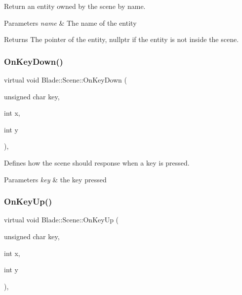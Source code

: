 Return an entity owned by the scene by name. 


\begin{DoxyParams}{Parameters}
{\em name} & The name of the entity \\
\hline
\end{DoxyParams}
\begin{DoxyReturn}{Returns}
The pointer of the entity, nullptr if the entity is not inside the scene. 
\end{DoxyReturn}
\mbox{\label{class_blade_1_1_scene_abb80a0590b4d723b5f13ec8c488e513a}} 
\subsubsection{\texorpdfstring{On\+Key\+Down()}{OnKeyDown()}}
{\footnotesize\ttfamily virtual void Blade\+::\+Scene\+::\+On\+Key\+Down (\begin{DoxyParamCaption}\item[{unsigned char}]{key,  }\item[{int}]{x,  }\item[{int}]{y }\end{DoxyParamCaption})\hspace{0.3cm}{\ttfamily [pure virtual]}, {\ttfamily [noexcept]}}



Defines how the scene should response when a key is pressed. 


\begin{DoxyParams}{Parameters}
{\em key} & the key pressed \\
\hline
\end{DoxyParams}
\mbox{\label{class_blade_1_1_scene_abe25ad91527c82b56409be7097afbf49}} 
\subsubsection{\texorpdfstring{On\+Key\+Up()}{OnKeyUp()}}
{\footnotesize\ttfamily virtual void Blade\+::\+Scene\+::\+On\+Key\+Up (\begin{DoxyParamCaption}\item[{unsigned char}]{key,  }\item[{int}]{x,  }\item[{int}]{y }\end{DoxyParamCaption})\hspace{0.3cm}{\ttfamily [pure virtual]}, {\ttfamily [noexcept]}}



